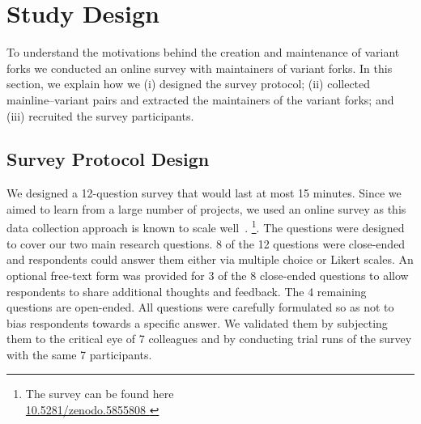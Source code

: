 \section{Study Design}
\label{sec:study_design}

To understand the motivations behind the creation and maintenance of variant forks we conducted an online survey with maintainers of variant forks. In this section, we explain how we (i) designed the survey protocol; (ii) collected mainline--variant pairs and extracted the maintainers of the variant forks; and (iii) recruited the survey participants.


\subsection{Survey Protocol Design}
\label{sec:protocal}

We designed a 12-question survey that would last at most 15 minutes.
Since we aimed to learn from a large number of projects, we used an online survey as this data collection approach is known to scale well~\cite{Flick:2014}.
\footnote{The survey can be found here\\ \url{10.5281/zenodo.5855808
}}.
The questions were designed to cover our two main research questions.
8 of the 12 questions were close-ended and respondents could answer them either via multiple choice or Likert scales.
An optional free-text form was provided for 3 of the 8 close-ended questions to allow respondents to share additional thoughts and feedback.
The 4 remaining questions are open-ended.
All questions were carefully formulated so as not to bias respondents towards a specific answer. We validated them by subjecting them to the critical eye of 7 colleagues and by conducting trial runs of the survey with the same 7 participants.%

